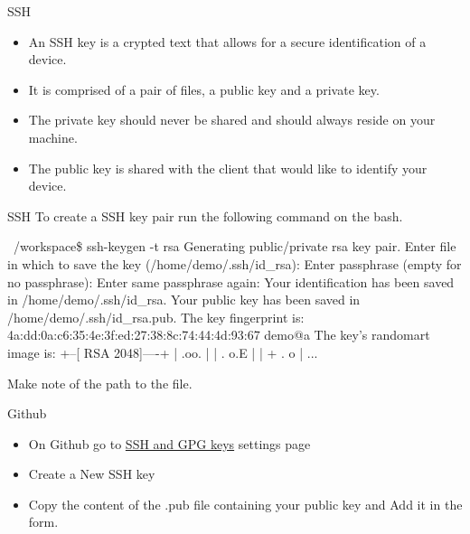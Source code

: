 \begin{frame}[fragile]{SSH}
\begin{itemize}[<+->] 
    \item An SSH key is a crypted text that allows for a secure identification of a device.
    \item It is comprised of a pair of files, a public key and a private key.
    \item The private key should never be shared and should always reside on your machine.
    \item The public key is shared with the client that would like to identify your device.
\end{itemize}
\end{frame}

\begin{frame}[fragile]{SSH\insertcontinuationtext}
    To create a SSH key pair run the following command on the bash.
    \begin{shellblock}
~/workspace\$ ssh-keygen -t rsa
Generating public/private rsa key pair.
Enter file in which to save the key (/home/demo/.ssh/id_rsa): 
Enter passphrase (empty for no passphrase): 
Enter same passphrase again: 
Your identification has been saved in /home/demo/.ssh/id_rsa.
Your public key has been saved in /home/demo/.ssh/id_rsa.pub.
The key fingerprint is:
4a:dd:0a:c6:35:4e:3f:ed:27:38:8c:74:44:4d:93:67 demo@a
The key's randomart image is:
+--[ RSA 2048]----+
|          .oo.   |
|         .  o.E  |
|        + .  o   |
...
    \end{shellblock}
Make note of the path to the  file.
\end{frame}

\begin{frame}[fragile]{Github \insertcontinuationtext}
    \begin{itemize}[<+->] 
        \item On Github go to \alert{\href{https://github.com/settings/keys}{SSH and GPG keys}} settings page
        \item Create a New SSH key
        \item Copy the content of the .pub file containing your public key and Add it in the form.
    \end{itemize}
\end{frame}

